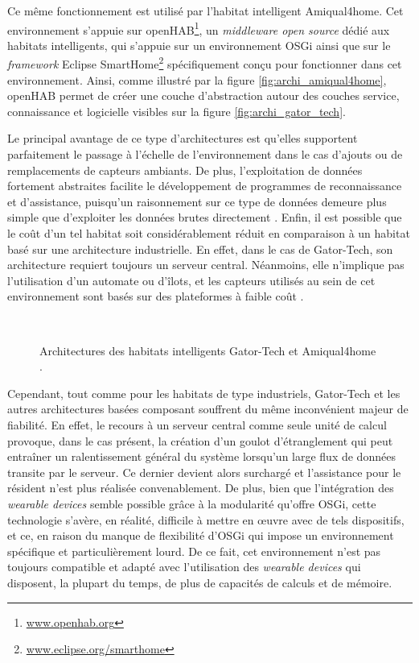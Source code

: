 Ce même fonctionnement est utilisé par l'habitat intelligent Amiqual4home. Cet environnement s'appuie sur \ac{openHAB}\footnote{\url{www.openhab.org}}, un \textit{middleware open source} dédié aux habitats intelligents, qui s'appuie sur un environnement \acs{OSGi} ainsi que sur le \textit{framework} Eclipse SmartHome\footnote{\url{www.eclipse.org/smarthome}} spécifiquement conçu pour fonctionner dans cet environnement. Ainsi, comme illustré par la figure \ref{fig:archi_amiqual4home}, \acs{openHAB} permet de créer une couche d'abstraction autour des couches service, connaissance et logicielle visibles sur la figure \ref{fig:archi_gator_tech}.

Le principal avantage de ce type d'architectures est qu'elles supportent parfaitement le passage à l'échelle de l'environnement dans le cas d'ajouts ou de remplacements de capteurs ambiants. De plus, l'exploitation de données fortement abstraites facilite le développement de programmes de reconnaissance et d'assistance, puisqu'un raisonnement sur ce type de données demeure plus simple que d'exploiter les données brutes directement \citep{Helal2005}. Enfin, il est possible que le coût d'un tel habitat soit considérablement réduit en comparaison à un habitat basé sur une architecture industrielle. En effet, dans le cas de Gator-Tech, son architecture requiert toujours un serveur central. Néanmoins, elle n'implique pas l'utilisation d'un automate ou d'îlots, et les capteurs utilisés au sein de cet environnement sont basés sur des plateformes à faible coût \citep{Helal2005}.

\begin{figure}[H]
	\centering
	\\[20pt]
	\caption[Architectures des habitats intelligents Gator-Tech et Amiqual4home.]{Architectures des habitats intelligents Gator-Tech \citep{Helal2005} et Amiqual4home \citep{Lago2017}.}
\end{figure}

Cependant, tout comme pour les habitats de type industriels, Gator-Tech et les autres architectures basées composant souffrent du même inconvénient majeur de fiabilité. En effet, le recours à un serveur central comme seule unité de calcul provoque, dans le cas présent, la création d'un goulot d'étranglement qui peut entraîner un ralentissement général du système lorsqu'un large flux de données transite par le serveur. Ce dernier devient alors surchargé et l'assistance pour le résident n'est plus réalisée convenablement. De plus, bien que l'intégration des \textit{wearable devices} semble possible grâce à la modularité qu'offre \acs{OSGi}, cette technologie s'avère, en réalité, difficile à mettre en \oe{}uvre avec de tels dispositifs, et ce, en raison du manque de flexibilité d'\acs{OSGi} qui impose un environnement spécifique et particulièrement lourd. De ce fait, cet environnement n'est pas toujours compatible et adapté avec l'utilisation des \textit{wearable devices} qui disposent, la plupart du temps, de plus de capacités de calculs et de mémoire.

